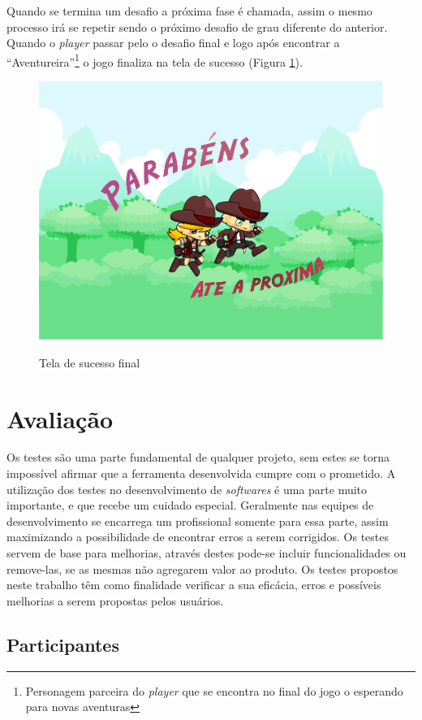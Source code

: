 \documentclass[
	12pt,				%
    oneside,			%
	a4paper,			%
	english,			%
	french,				%
	spanish,			%
	brazil,				%
	]{abntex2}
\begin{document}
		Quando se termina um desafio a próxima fase é chamada, assim o mesmo processo irá se repetir sendo o próximo desafio de grau diferente do anterior. Quando o \textit{player} passar pelo o desafio final e logo após encontrar a “Aventureira”\footnote{Personagem parceira do \textit{player} que se encontra no final do jogo o esperando para novas aventuras} o jogo finaliza na tela de sucesso (Figura \ref*{fig:24}).
		\begin{figure}[H]
			\caption{Tela de sucesso final}
			\centering
			\includegraphics[width=0.7\linewidth]{Imagens/24}
			\label{fig:24}
		\end{figure}
		
	
\section{Avaliação}

	Os testes são uma parte fundamental de qualquer projeto, sem estes se torna impossível afirmar que a ferramenta desenvolvida cumpre com o prometido. A utilização dos testes no desenvolvimento de \textit{softwares} é uma parte muito importante, e que recebe um cuidado especial. Geralmente nas equipes de desenvolvimento se encarrega um profissional somente para essa parte, assim maximizando a possibilidade de encontrar erros a serem corrigidos. Os testes servem de base para melhorias, através destes pode-se incluir funcionalidades ou remove-las, se as mesmas não agregarem valor ao produto. Os testes propostos neste trabalho têm como finalidade verificar a sua eficácia, erros e possíveis melhorias a serem propostas pelos usuários.
	
	\subsection{Participantes}
	
\end{document}
